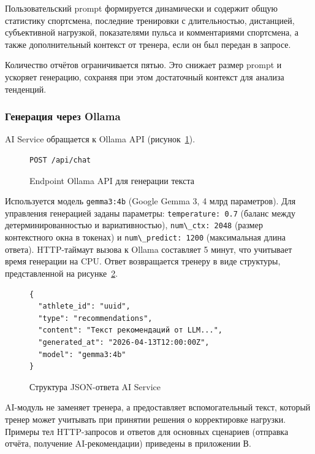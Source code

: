 Пользовательский prompt формируется динамически и содержит общую статистику спортсмена, последние тренировки с длительностью, дистанцией, субъективной нагрузкой, показателями пульса и комментариями спортсмена, а также дополнительный контекст от тренера, если он был передан в запросе.

Количество отчётов ограничивается пятью. Это снижает размер prompt и ускоряет генерацию, сохраняя при этом достаточный контекст для анализа тенденций.

\subsubsection{Генерация через Ollama}

AI Service обращается к Ollama API (рисунок~\ref{src:ollama-endpoint}).

\begin{figure}
\begin{lstlisting}
POST /api/chat
\end{lstlisting}
\caption{Endpoint Ollama API для генерации текста}
\label{src:ollama-endpoint}
\end{figure}

Используется модель \passthrough{\lstinline!gemma3:4b!} (Google Gemma 3, 4 млрд параметров). Для управления генерацией заданы параметры: \passthrough{\lstinline!temperature: 0.7!} (баланс между детерминированностью и вариативностью), \passthrough{\lstinline!num\_ctx: 2048!} (размер контекстного окна в токенах) и \passthrough{\lstinline!num\_predict: 1200!} (максимальная длина ответа). HTTP-таймаут вызова к Ollama составляет 5 минут, что учитывает время генерации на CPU. Ответ возвращается тренеру в виде структуры, представленной на рисунке~\ref{src:ai-response}.

\begin{figure}
\begin{lstlisting}
{
  "athlete_id": "uuid",
  "type": "recommendations",
  "content": "Текст рекомендаций от LLM...",
  "generated_at": "2026-04-13T12:00:00Z",
  "model": "gemma3:4b"
}
\end{lstlisting}
\caption{Структура JSON-ответа AI Service}
\label{src:ai-response}
\end{figure}

AI-модуль не заменяет тренера, а предоставляет вспомогательный текст, который тренер может учитывать при принятии решения о корректировке нагрузки. Примеры тел HTTP-запросов и ответов для основных сценариев (отправка отчёта, получение AI-рекомендации) приведены в приложении В.

